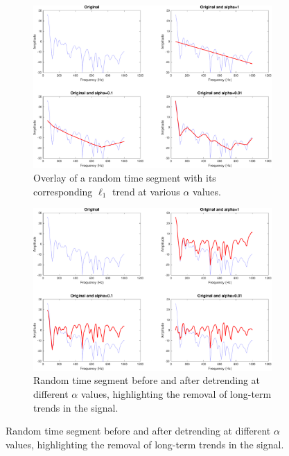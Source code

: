 \begin{figure}[htbp]
    \centering
    \begin{subfigure}[t]{\textwidth}
        \centering
        \includegraphics[width=\textwidth]{img/ch4/l1/example_l1_plots/segment_l1_trend.pdf}
        \caption{Overlay of a random time segment with its corresponding $\ell_1$ trend at various $\alpha$ values.}
        \label{fig:l1:segment-trend}
    \end{subfigure}
    
    \vspace{1cm}
    
    \begin{subfigure}[t]{\textwidth}
        \centering
        \includegraphics[width=\textwidth]{img/ch4/l1/example_l1_plots/segment_detrended.pdf}
        \caption{Random time segment before and after detrending at different $\alpha$ values, highlighting the removal of long-term trends in the signal.}
        \label{fig:l1:segment-detrended}
    \end{subfigure}
\end{figure}

